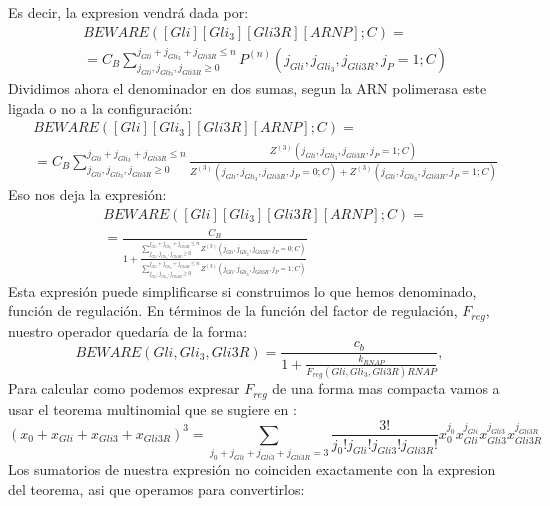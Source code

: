 Es decir, la expresion vendrá dada por: 
\begin{equation}
\begin{split}
&BEWARE([Gli][Gli_3][Gli3R][ARNP];C)=\\&=C_B\sum_{j_{Gli}, j_{Gli_3}, j_{Gli3R}\geq0}^{j_{Gli}+ j_{Gli_3}+ j_{Gli3R}\leq n}P^{(n)}(j_{Gli}, j_{Gli_3}, j_{Gli3R},j_P=1;C)
\end{split}
\end{equation}
Dividimos ahora el denominador en dos sumas, segun la ARN polimerasa este ligada o no a la configuración:
\begin{equation}
\begin{split}
&BEWARE([Gli][Gli_3][Gli3R][ARNP];C)=\\&=C_B\sum_{j_{Gli}, j_{Gli_3}, j_{Gli3R}\geq0}^{j_{Gli}+ j_{Gli_3}+ j_{Gli3R}\leq n}\frac{Z^{(3)}(j_{Gli}, j_{Gli_3}, j_{Gli3R},j_P=1;C)}{Z^{(3)}(j_{Gli}, j_{Gli_3}, j_{Gli3R},j_P=0;C)+Z^{(3)}(j_{Gli}, j_{Gli_3}, j_{Gli3R},j_P=1;C)}
\end{split}
\end{equation}
Eso nos deja la expresión:
\begin{equation}
\begin{split}
&BEWARE([Gli][Gli_3][Gli3R][ARNP];C)=\\&=\frac{C_B}{1+\frac{\sum_{j_{Gli}, j_{Gli_3}, j_{Gli3R}\geq0}^{j_{Gli}+ j_{Gli_3}+ j_{Gli3R}\leq n}Z^{(3)}(j_{Gli}, j_{Gli_3}, j_{Gli3R},j_P=0;C)}{\sum_{j_{Gli}, j_{Gli_3}, j_{Gli3R}\geq0}^{j_{Gli}+ j_{Gli_3}+ j_{Gli3R}\leq n}Z^{(3)}(j_{Gli}, j_{Gli_3}, j_{Gli3R},j_P=1;C)}}
\end{split}
\end{equation}
Esta expresión puede simplificarse si construimos lo que hemos denominado, función de regulación. En términos de la función del factor de regulación, $F_{reg}$, nuestro operador quedaría de la forma:
\begin{equation}
BEWARE(Gli, Gli_3, Gli3R)=\frac{c_{b}}{1 + \frac{k_{RNAP}}{F_{reg}(Gli, Gli_3, Gli3R) RNAP}},
\end{equation}
Para calcular como podemos expresar $F_{reg}$ de una forma mas compacta vamos a usar el teorema multinomial que se sugiere en \cite{cambon1}:
\begin{equation}
(x_0+x_{Gli}+x_{Gli3}+x_{Gli3R})^3=\sum_{j_0+j_{Gli}+j_{Gli3}+j_{Gli3R}=3}\frac{3!}{j_0!j_{Gli}!j_{Gli3}!j_{Gli3R}!}x_0^{j_0}x_{Gli}^{j_{Gli}}x_{Gli3}^{j_{Gli3}}x_{Gli3R}^{j_{Gli3R}}\label{S:21}
\end{equation}
Los sumatorios de nuestra expresión no coinciden exactamente con la expresion del teorema, asi que operamos para convertirlos: 
